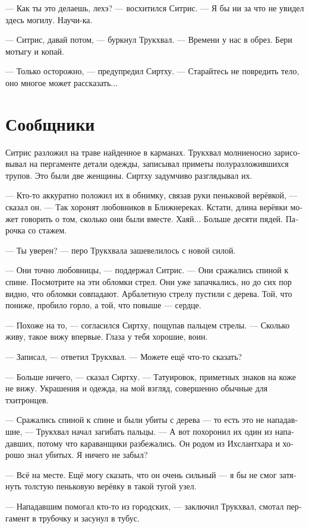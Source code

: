 \documentclass[a4paper,12pt,fleqn]{book}\usepackage{cooltooltips}\usepackage{polyglossia}\setdefaultlanguage[babelshorthands=true]{russian}\setotherlanguage{english}\defaultfontfeatures{Ligatures=TeX,Mapping=tex-text} \usepackage{xcolor}\definecolor{lightgray}{HTML}{bbbbbb}\color{lightgray}\newcommand{\ml}[3]{\textenglish{\textcolor{black}{#3}} }
\begin{document}
--- Как ты это делаешь, лехэ? --- восхитился Ситрис.
--- Я бы ни за что не увидел здесь могилу.
Научи-ка.

--- Ситрис, давай потом, --- буркнул Трукхвал.
--- Времени у нас в обрез.
Бери мотыгу и копай.

--- Только осторожно, --- предупредил Сиртху.
--- Старайтесь не повредить тело, оно многое может рассказать...

\section{Сообщники}

Ситрис разложил на траве найденное в карманах.
Трукхвал молниеносно зарисовывал на пергаменте детали одежды, записывал приметы полуразложившихся трупов.
Это были две женщины.
Сиртху задумчиво разглядывал их.

--- Кто-то аккуратно положил их в обнимку, связав руки пеньковой верёвкой, --- сказал он.
--- Так хоронят любовников в Ближнереках.
Кстати, длина верёвки может говорить о том, сколько они были вместе.
Хаяй...
Больше десяти пядей.
Парочка со стажем.

--- Ты уверен? --- перо Трукхвала зашевелилось с новой силой.

--- Они точно любовницы, --- поддержал Ситрис.
--- Они сражались спиной к спине.
Посмотрите на эти обломки стрел.
Они уже запачкались, но до сих пор видно, что обломки совпадают.
Арбалетную стрелу пустили с дерева.
Той, что пониже, пробило горло, а той, что повыше --- сердце.

--- Похоже на то, --- согласился Сиртху, пощупав пальцем стрелы.
--- Сколько живу, такое вижу впервые.
Глаза у тебя хорошие, воин.

--- Записал, --- ответил Трукхвал.
--- Можете ещё что-то сказать?

--- Больше ничего, --- сказал Сиртху.
--- Татуировок, приметных знаков на коже не вижу.
Украшения и одежда, на мой взгляд, совершенно обычные для тхитронцев.

--- Сражались спиной к спине и были убиты с дерева --- то есть это не нападавшие, --- Трукхвал начал загибать пальцы.
--- А вот похоронил их один из нападавших, потому что караванщики разбежались.
Он родом из Ихслантхара и хорошо знал убитых.
Я ничего не забыл?

--- Всё на месте.
Ещё могу сказать, что он очень сильный --- я бы не смог затянуть толстую пеньковую верёвку в такой тугой узел.

--- Нападавшим помогал кто-то из городских, --- заключил Трукхвал, смотал пергамент в трубочку и засунул в тубус.
\end{document}
